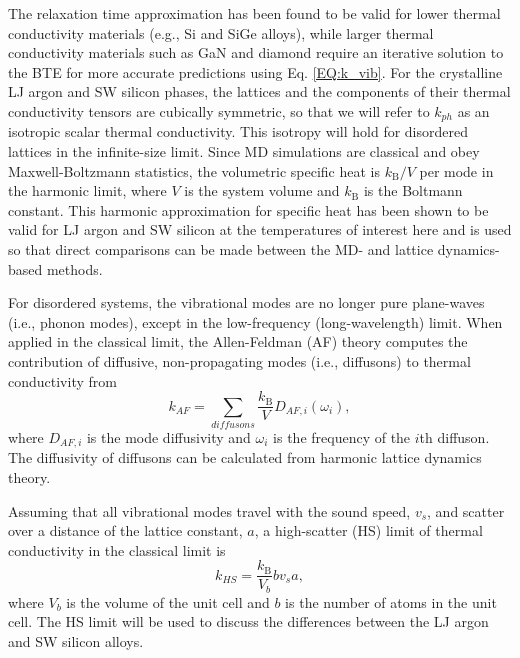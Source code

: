 \documentclass[aps,prb,onecolumn,preprint,footinbib,superscriptaddress,amsmath,amssymb,floatfix]{revtex4}
\begin{document}
The relaxation time approximation has been found to be valid  
for lower thermal conductivity materials 
(e.g., Si and SiGe alloys),
\cite{broido_intrinsic_2007,ward_intrinsic_2010,garg_role_2011} 
while larger thermal conductivity 
materials such as GaN and diamond require an  
iterative solution to the BTE for more accurate predictions 
using Eq. \eqref{EQ:k_vib}.
\cite{ward_ab_2009,lindsay_thermal_2012} 
For the crystalline LJ argon and SW silicon phases, 
the lattices and the components of their 
thermal conductivity tensors are cubically symmetric, 
so that we will refer to 
$k_{ph}$ as an isotropic scalar thermal conductivity. 
This isotropy will hold for disordered lattices 
in the infinite-size limit. 
Since MD simulations are classical 
and obey Maxwell-Boltzmann 
statistics,\cite{mcquarrie_statistical_2000} the volumetric 
specific heat is $k_{\text{B}}/V$ per mode in the harmonic limit, where $V$ 
is the system volume and $k_{\text{B}}$ is the Boltmann constant. 
This harmonic approximation for specific heat has been shown to be valid 
for LJ argon and SW silicon at the temperatures of interest here
\cite{mcgaughey_quantitative_2004,goicochea_thermal_2010} 
and is used so that direct comparisons can be made between 
the MD- and lattice dynamics-based methods.

For disordered systems, the vibrational modes are no 
longer pure plane-waves (i.e., phonon modes), except in the low-frequency 
(long-wavelength) limit. When applied in the classical limit, 
the Allen-Feldman (AF) theory computes 
the contribution of diffusive, non-propagating modes (i.e., diffusons) 
to thermal conductivity from\cite{allen_thermal_1993} 
\begin{equation}\label{EQ:M:k_AF}
k_{AF} = \sum_{diffusons} \frac{k_{\text{B}}}{V} D_{AF,i}(\omega_i),
\end{equation}
where $D_{AF,i}$ is the mode diffusivity and $\omega_i$ is the 
frequency of the $i$th diffuson. The diffusivity of diffusons 
can be calculated from harmonic lattice dynamics theory.
\cite{allen_thermal_1993,feldman_thermal_1993,feldman_numerical_1999} 

Assuming that all vibrational modes travel with the sound speed, $v_s$, and 
scatter over a distance of the lattice constant, $a$, 
a high-scatter (HS) limit of thermal conductivity in the classical 
limit is\cite{cahill_lattice_1988} 
\begin{equation}\label{EQ:M:k_AF,HS}
k_{HS} = \frac{k_{\text{B}}}{V_b}b v_s a,
\end{equation}
where $V_b$ is the volume of the unit cell and $b$ is the number of atoms 
in the unit cell. The HS limit will be used to 
discuss the differences between the LJ argon and SW silicon alloys. 
\end{document}
